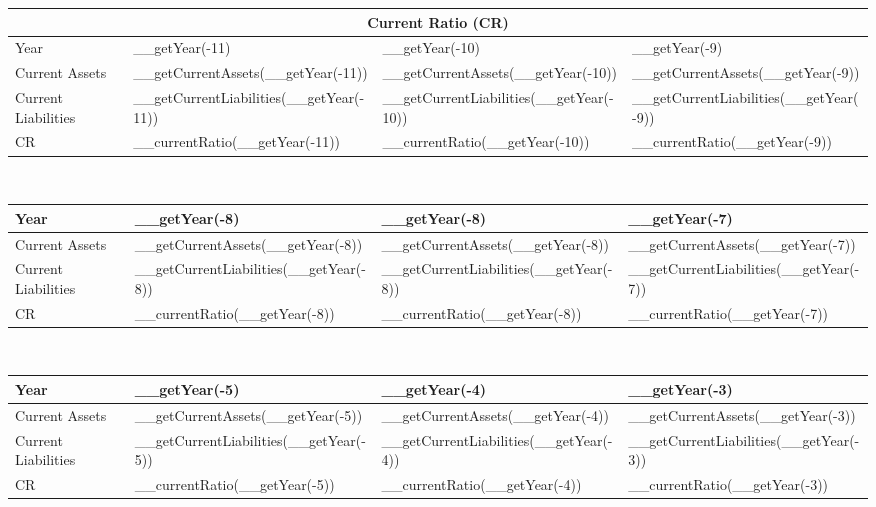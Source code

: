 \begin{tabularx}{\textwidth}{|X|X|X|X|}
 \hline
 \multicolumn{4}{|c|}{Current Ratio (CR)} \\
 \hline
 Year                    & __getYear(-11)                          & __getYear(-10)                          & __getYear(-9)                          \\
 \hline
 Current Assets          & __getCurrentAssets(__getYear(-11))      & __getCurrentAssets(__getYear(-10))      & __getCurrentAssets(__getYear(-9))      \\
 Current Liabilities     & __getCurrentLiabilities(__getYear(-11)) & __getCurrentLiabilities(__getYear(-10)) & __getCurrentLiabilities(__getYear(-9)) \\
 \rowcolor{lightgray} CR & __currentRatio(__getYear(-11))          & __currentRatio(__getYear(-10))          & __currentRatio(__getYear(-9))          \\
 \hline
\end{tabularx}\\

\begin{tabularx}{\textwidth}{|X|X|X|X|}
 \hline
 Year                    & __getYear(-8)                          & __getYear(-8)                          & __getYear(-7)                          \\
 \hline
 Current Assets          & __getCurrentAssets(__getYear(-8))      & __getCurrentAssets(__getYear(-8))      & __getCurrentAssets(__getYear(-7))      \\
 Current Liabilities     & __getCurrentLiabilities(__getYear(-8)) & __getCurrentLiabilities(__getYear(-8)) & __getCurrentLiabilities(__getYear(-7)) \\
 \rowcolor{lightgray} CR & __currentRatio(__getYear(-8))          & __currentRatio(__getYear(-8))          & __currentRatio(__getYear(-7))          \\
 \hline
\end{tabularx}\\

\begin{tabularx}{\textwidth}{|X|X|X|X|}
 \hline
 Year                    & __getYear(-5)                          & __getYear(-4)                          & __getYear(-3)                          \\
 \hline
 Current Assets          & __getCurrentAssets(__getYear(-5))      & __getCurrentAssets(__getYear(-4))      & __getCurrentAssets(__getYear(-3))      \\
 Current Liabilities     & __getCurrentLiabilities(__getYear(-5)) & __getCurrentLiabilities(__getYear(-4)) & __getCurrentLiabilities(__getYear(-3)) \\
 \rowcolor{lightgray} CR & __currentRatio(__getYear(-5))          & __currentRatio(__getYear(-4))          & __currentRatio(__getYear(-3))          \\
 \hline
\end{tabularx}\\

